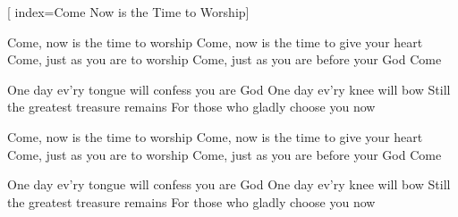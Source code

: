 
\repchoruses

[
index={Come Now is the Time to Worship}]               %



\beginverse
Come, now is the time to worship
Come, now is the time to give your heart
Come, just as you are to worship
Come, just as you are before your God
Come
\endverse

\beginchorus
One day ev'ry tongue will confess you are God
One day ev'ry knee will bow
Still the greatest treasure remains
For those who gladly choose you now
\endchorus

\beginverse
Come, now is the time to worship
Come, now is the time to give your heart
Come, just as you are to worship
Come, just as you are before your God
Come
\endverse


\beginchorus
One day ev'ry tongue will confess you are God
One day ev'ry knee will bow
Still the greatest treasure remains
For those who gladly choose you now
\endchorus


\endsong
